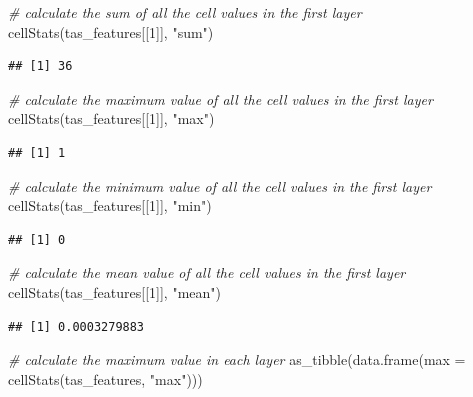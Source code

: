 \documentclass[
  12pt,
]{book}
\newenvironment{Shaded}{\begin{snugshade}}{\end{snugshade}}
\newcommand{\AttributeTok}[1]{\textcolor[rgb]{0.77,0.63,0.00}{#1}}
\newcommand{\CommentTok}[1]{\textcolor[rgb]{0.56,0.35,0.01}{\textit{#1}}}
\newcommand{\DecValTok}[1]{\textcolor[rgb]{0.00,0.00,0.81}{#1}}
\newcommand{\FunctionTok}[1]{\textcolor[rgb]{0.00,0.00,0.00}{#1}}
\newcommand{\NormalTok}[1]{#1}
\newcommand{\StringTok}[1]{\textcolor[rgb]{0.31,0.60,0.02}{#1}}
\begin{document}
\begin{Shaded}
\begin{Highlighting}[]
\CommentTok{\# calculate the sum of all the cell values in the first layer}
\FunctionTok{cellStats}\NormalTok{(tas\_features[[}\DecValTok{1}\NormalTok{]], }\StringTok{"sum"}\NormalTok{)}
\end{Highlighting}
\end{Shaded}

\begin{verbatim}
## [1] 36
\end{verbatim}

\begin{Shaded}
\begin{Highlighting}[]
\CommentTok{\# calculate the maximum value of all the cell values in the first layer}
\FunctionTok{cellStats}\NormalTok{(tas\_features[[}\DecValTok{1}\NormalTok{]], }\StringTok{"max"}\NormalTok{)}
\end{Highlighting}
\end{Shaded}

\begin{verbatim}
## [1] 1
\end{verbatim}

\begin{Shaded}
\begin{Highlighting}[]
\CommentTok{\# calculate the minimum value of all the cell values in the first layer}
\FunctionTok{cellStats}\NormalTok{(tas\_features[[}\DecValTok{1}\NormalTok{]], }\StringTok{"min"}\NormalTok{)}
\end{Highlighting}
\end{Shaded}

\begin{verbatim}
## [1] 0
\end{verbatim}

\begin{Shaded}
\begin{Highlighting}[]
\CommentTok{\# calculate the mean value of all the cell values in the first layer}
\FunctionTok{cellStats}\NormalTok{(tas\_features[[}\DecValTok{1}\NormalTok{]], }\StringTok{"mean"}\NormalTok{)}
\end{Highlighting}
\end{Shaded}

\begin{verbatim}
## [1] 0.0003279883
\end{verbatim}

\clearpage

\begin{Shaded}
\begin{Highlighting}[]
\CommentTok{\# calculate the maximum value in each layer}
\FunctionTok{as\_tibble}\NormalTok{(}\FunctionTok{data.frame}\NormalTok{(}\AttributeTok{max =} \FunctionTok{cellStats}\NormalTok{(tas\_features, }\StringTok{"max"}\NormalTok{)))}
\end{Highlighting}
\end{Shaded}
\end{document}
